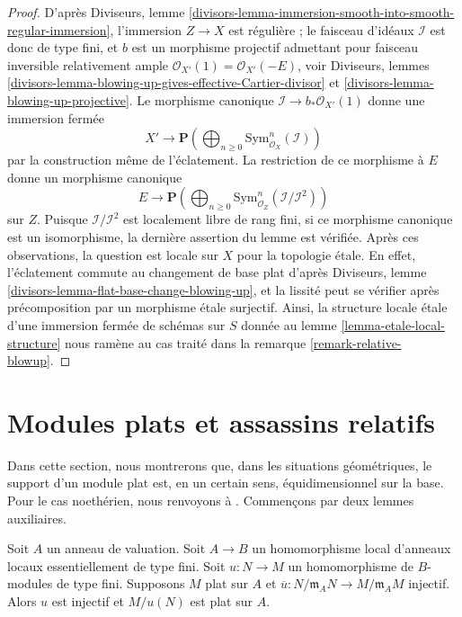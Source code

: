 \begin{proof}
D'après Diviseurs, lemme
\ref{divisors-lemma-immersion-smooth-into-smooth-regular-immersion},
l'immersion $Z \to X$ est régulière ; le faisceau d'idéaux
$\mathcal{I}$ est donc de type fini, et $b$ est un morphisme projectif
admettant pour faisceau inversible relativement ample
$\mathcal{O}_{X'}(1) = \mathcal{O}_{X'}(-E)$, voir
Diviseurs, lemmes
\ref{divisors-lemma-blowing-up-gives-effective-Cartier-divisor} et
\ref{divisors-lemma-blowing-up-projective}.
Le morphisme canonique $\mathcal{I} \to b_*\mathcal{O}_{X'}(1)$
donne une immersion fermée
$$
X' \longrightarrow
\mathbf{P}\left(\bigoplus\nolimits_{n \geq 0}
\text{Sym}^n_{\mathcal{O}_X}(\mathcal{I})\right)
$$
par la construction même de l'éclatement. La restriction de ce morphisme
à $E$ donne un morphisme canonique
$$
E \longrightarrow
\mathbf{P}\left(\bigoplus\nolimits_{n \geq 0}
\text{Sym}^n_{\mathcal{O}_Z}(\mathcal{I}/\mathcal{I}^2)\right)
$$
sur $Z$. Puisque $\mathcal{I}/\mathcal{I}^2$ est localement libre de rang fini,
si ce morphisme canonique est un isomorphisme, la dernière assertion du
lemme est vérifiée. Après ces observations, la question est locale
sur $X$ pour la topologie étale. En effet, l'éclatement commute au changement
de base plat d'après Diviseurs, lemme \ref{divisors-lemma-flat-base-change-blowing-up},
et la lissité peut se vérifier après précomposition par un morphisme
étale surjectif. Ainsi, la structure locale étale d'une
immersion fermée de schémas sur $S$ donnée au lemme
\ref{lemma-etale-local-structure} nous ramène au
cas traité dans la remarque \ref{remark-relative-blowup}.
\end{proof}
\section{Modules plats et assassins relatifs}
\label{section-flat-relative-assassin}

\noindent
Dans cette section, nous montrerons que, dans les situations géométriques,
le support d'un module plat est, en un certain sens, équidimensionnel sur la base.
Pour le cas noethérien, nous renvoyons à
\cite[IV Proposition 12.1.1.5]{EGA}.
Commençons par deux lemmes auxiliaires.

\begin{lemma}
\label{lemma-mod-injective-valuation-ring}
Soit $A$ un anneau de valuation. Soit $A \to B$ un homomorphisme local
d'anneaux locaux essentiellement de type fini.
Soit $u : N \to M$ un homomorphisme de $B$-modules de type fini.
Supposons $M$ plat sur $A$ et
$\overline{u} : N/\mathfrak m_A N \to M/\mathfrak m_A M$ injectif.
Alors $u$ est injectif et $M/u(N)$ est plat sur $A$.
\end{lemma}

